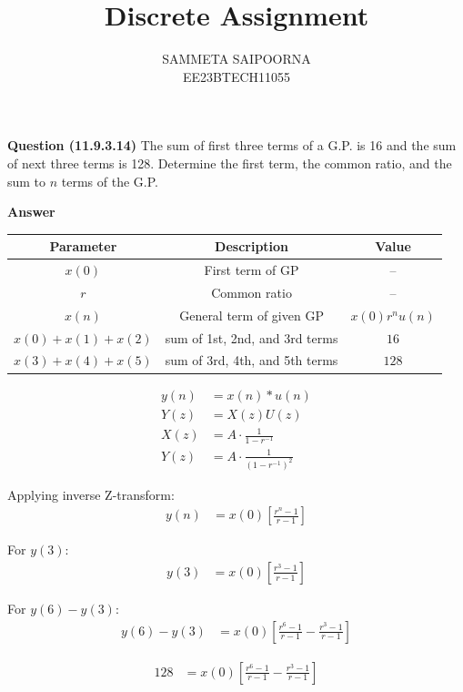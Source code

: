 \documentclass[journal,12pt,onecolumn]{IEEEtran}
\title{Discrete Assignment}
\author{SAMMETA SAIPOORNA\\ EE23BTECH11055}
\theoremstyle{remark}
\begin{document}
\maketitle


\textbf{Question (11.9.3.14)}
The sum of first three terms of a G.P. is 16 and the sum of next three terms is 128. Determine the first term, the common ratio, and the sum to $n$ terms of the G.P.

\textbf{Answer}

\begin{tabular}{|c|c|c|}
      \hline
      Parameter & Description & Value\\\hline
      $x(0)$ & First term of GP & --\\\hline
      $r$ & Common ratio & --\\\hline
      $x(n)$ & General term of given GP & $x(0)r^nu(n)$\\\hline
      $x(0)+x(1)+x(2)$ & sum of 1st, 2nd, and 3rd terms & $16$\\\hline
      $x(3)+x(4)+x(5)$ & sum of 3rd, 4th, and 5th terms & $128$\\\hline
\end{tabular}

\begin{align}
    y(n) &= x(n) * u(n) \label{eq:11.9.3.14.1} \\
    Y(z) &= X(z) U(z) \label{eq:11.9.3.14.2} \\
    X(z) &= A \cdot \frac{1}{1 - r^{-1}} \label{eq:11.9.3.14.3} \\
    Y(z) &= A \cdot \frac{1}{(1 - r^{-1})^2} \label{eq:11.9.3.14.4}
\end{align}

Applying inverse Z-transform:
\begin{align}
y(n) &= x(0) \left[ \frac{r^n - 1}{r - 1} \right] \label{eq:11.9.3.14.5}
\end{align}

For $y(3)$:
\begin{align}
y(3) &= x(0) \left[ \frac{r^3 - 1}{r - 1} \right] \label{eq:11.9.3.14.6}
\end{align}

For $y(6) - y(3)$:
\begin{align}
y(6) - y(3) &= x(0) \left[ \frac{r^6 - 1}{r - 1} - \frac{r^3 - 1}{r - 1} \right] \label{eq:11.9.3.14.7}
\end{align}

\begin{align}
128 &= x(0)\left[\frac{r^6 - 1}{r - 1} - \frac{r^3 - 1}{r - 1}\right] \label{eq:11.9.3.14.8}
\end{align}
\end{document}
